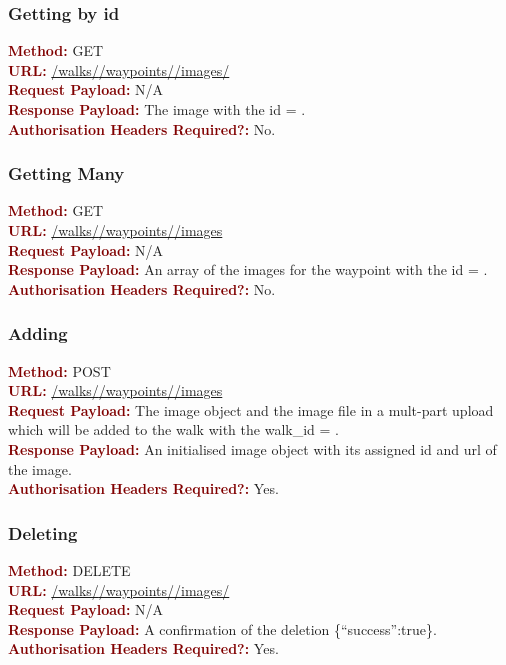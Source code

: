 \documentclass[11pt,a4paper]{report}
\begin{document}
\subsubsection{Getting by id}
\textbf{\textcolor{Maroon}{Method:}} GET\\
\textbf{\textcolor{Maroon}{URL:}} \url{/walks/}\url{/waypoints/}\url{/images/}\\
\textbf{\textcolor{Maroon}{Request Payload:}} N/A\\
\textbf{\textcolor{Maroon}{Response Payload:}} The image with the id = .\\
\textbf{\textcolor{Maroon}{Authorisation Headers Required?:}} No.

\subsubsection{Getting Many}
\textbf{\textcolor{Maroon}{Method:}} GET\\
\textbf{\textcolor{Maroon}{URL:}} \url{/walks/}\url{/waypoints/}\url{/images}\\
\textbf{\textcolor{Maroon}{Request Payload:}} N/A\\
\textbf{\textcolor{Maroon}{Response Payload:}} An array of the images for the waypoint with the id = .\\
\textbf{\textcolor{Maroon}{Authorisation Headers Required?:}} No.

\subsubsection{Adding}
\textbf{\textcolor{Maroon}{Method:}} POST\\
\textbf{\textcolor{Maroon}{URL:}} \url{/walks/}\url{/waypoints/}\url{/images}\\
\textbf{\textcolor{Maroon}{Request Payload:}} The image object and the image file in a mult-part upload which will be added to the walk with the walk\_id = .\\
\textbf{\textcolor{Maroon}{Response Payload:}} An initialised image object with its assigned id and url of the image.\\
\textbf{\textcolor{Maroon}{Authorisation Headers Required?:}} Yes.

\subsubsection{Deleting}
\textbf{\textcolor{Maroon}{Method:}} DELETE\\
\textbf{\textcolor{Maroon}{URL:}} \url{/walks/}\url{/waypoints/}\url{/images/}\\
\textbf{\textcolor{Maroon}{Request Payload:}} N/A\\
\textbf{\textcolor{Maroon}{Response Payload:}} A confirmation of the deletion \{``success'':true\}.\\
\textbf{\textcolor{Maroon}{Authorisation Headers Required?:}} Yes.
\end{document}
